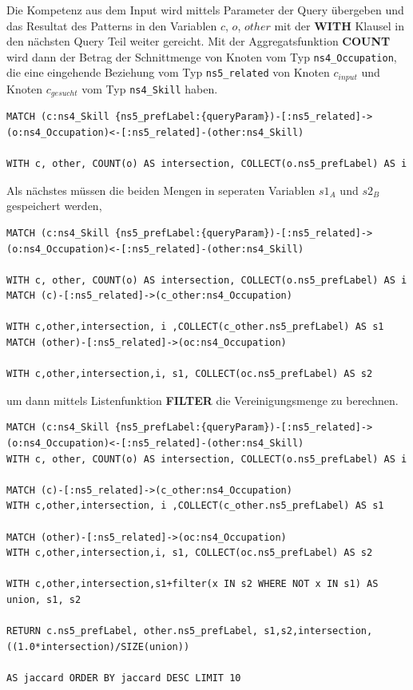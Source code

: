 Die Kompetenz aus dem Input wird mittels Parameter der Query übergeben und das Resultat des Patterns in den Variablen $c$, $o$, $other$  mit der \textbf{WITH} Klausel in den nächsten Query Teil weiter gereicht. Mit der Aggregatsfunktion \textbf{COUNT} wird dann der Betrag der Schnittmenge von Knoten vom Typ \texttt{ns4\_Occupation}, die eine eingehende Beziehung vom Typ \texttt{ns5\_related} von Knoten $c_{input}$ und Knoten $c_{gesucht}$ vom Typ \texttt{ns4\_Skill} haben. 
\newline

\begin{lstlisting}
MATCH (c:ns4_Skill {ns5_prefLabel:{queryParam})-[:ns5_related]->(o:ns4_Occupation)<-[:ns5_related]-(other:ns4_Skill)

WITH c, other, COUNT(o) AS intersection, COLLECT(o.ns5_prefLabel) AS i

\end{lstlisting}

Als nächstes müssen die beiden Mengen in seperaten Variablen $s1_{A}$ und $s2_{B}$ gespeichert werden,\newline

\begin{lstlisting}
MATCH (c:ns4_Skill {ns5_prefLabel:{queryParam})-[:ns5_related]->(o:ns4_Occupation)<-[:ns5_related]-(other:ns4_Skill)

WITH c, other, COUNT(o) AS intersection, COLLECT(o.ns5_prefLabel) AS i
MATCH (c)-[:ns5_related]->(c_other:ns4_Occupation)

WITH c,other,intersection, i ,COLLECT(c_other.ns5_prefLabel) AS s1
MATCH (other)-[:ns5_related]->(oc:ns4_Occupation)

WITH c,other,intersection,i, s1, COLLECT(oc.ns5_prefLabel) AS s2

\end{lstlisting}

um dann mittels Listenfunktion \textbf{FILTER} die Vereinigungsmenge zu berechnen.
\vspace{1em}

\begin{lstlisting}[language=SPARQL, morekeywords={MATCH, WITH, COLLECT}]
MATCH (c:ns4_Skill {ns5_prefLabel:{queryParam})-[:ns5_related]->(o:ns4_Occupation)<-[:ns5_related]-(other:ns4_Skill)
WITH c, other, COUNT(o) AS intersection, COLLECT(o.ns5_prefLabel) AS i

MATCH (c)-[:ns5_related]->(c_other:ns4_Occupation)
WITH c,other,intersection, i ,COLLECT(c_other.ns5_prefLabel) AS s1

MATCH (other)-[:ns5_related]->(oc:ns4_Occupation)
WITH c,other,intersection,i, s1, COLLECT(oc.ns5_prefLabel) AS s2

WITH c,other,intersection,s1+filter(x IN s2 WHERE NOT x IN s1) AS union, s1, s2

RETURN c.ns5_prefLabel, other.ns5_prefLabel, s1,s2,intersection,((1.0*intersection)/SIZE(union)) 

AS jaccard ORDER BY jaccard DESC LIMIT 10

\end{lstlisting}


